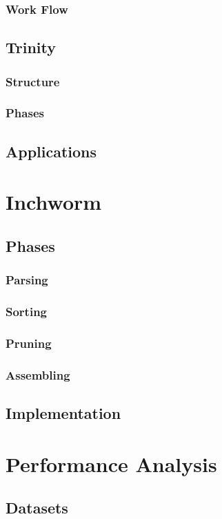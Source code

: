 \documentclass[plainarticle,zihtitle,english,final,hyperref,utf8]{zihpub}
\begin{document}
\subsubsection{Work Flow}
\subsection{Trinity}
\subsubsection{Structure}
\subsubsection{Phases}
\subsection{Applications}
\section{Inchworm}
\subsection{Phases}
\subsubsection{Parsing}
\subsubsection{Sorting}
\subsubsection{Pruning}
\subsubsection{Assembling}
\subsection{Implementation}
\section{Performance Analysis}
\subsection{Datasets}
\end{document}
